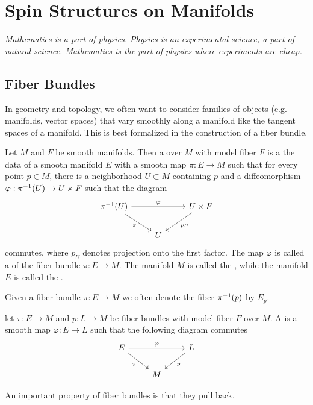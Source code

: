 \chapter{Spin Structures on Manifolds}
%
\subsectionend $ $\\
%
\emph{Mathematics is a part of physics. Physics is an experimental science, a part of
natural science. Mathematics is the part of physics where experiments are cheap.} \\
%
%
\subsectionend
%
\section{Fiber Bundles}
%
In geometry and topology, we often want to consider families of objects
(e.g. manifolds, vector spaces) that vary smoothly along a manifold like
the tangent spaces of a manifold. This is best formalized in the construction
of a fiber bundle.
%
\begin{defn}
Let $M$ and $F$ be smooth manifolds. Then a  over $M$ with
model fiber $F$ is a the data of a smooth manifold $E$ with a smooth map
$\pi : E \to M$ such that for every point $p \in M$, there is a neighborhood
$U \subset M$ containing $p$ and a diffeomorphism
$\varphi : \pi^{-1}(U) \to U \times F$ such that the diagram
\[\begin{tikzcd}
\pi\inv(U) \ar[rr, "\varphi"] \ar[dr, "\pi"']&& U \times F \ar[dl, "p_U"] \\
& U
\end{tikzcd}\]
commutes, where $p_U$ denotes projection onto the first factor. The map $\varphi$ is
called a  of the fiber bundle $\pi : E \to M$. The
manifold $M$ is called the , while the manifold $E$ is
called the .
\end{defn}
%
Given a fiber bundle $\pi : E \to M$ we often denote the fiber $\pi^{-1}(p)$
by $E_p$.
%
\begin{defn}
let $\pi : E \to M$ and $p : L \to M$ be fiber bundles with model fiber $F$
over $M$. A  is a smooth map $\varphi : E \to L$ such
that the following diagram commutes
\[\begin{tikzcd}
E \ar[dr, "\pi"']\ar[rr,"\varphi"] & & L \ar[dl, "p"] \\
& M
\end{tikzcd}\]
\end{defn}
%
An important property of fiber bundles is that they pull back.
